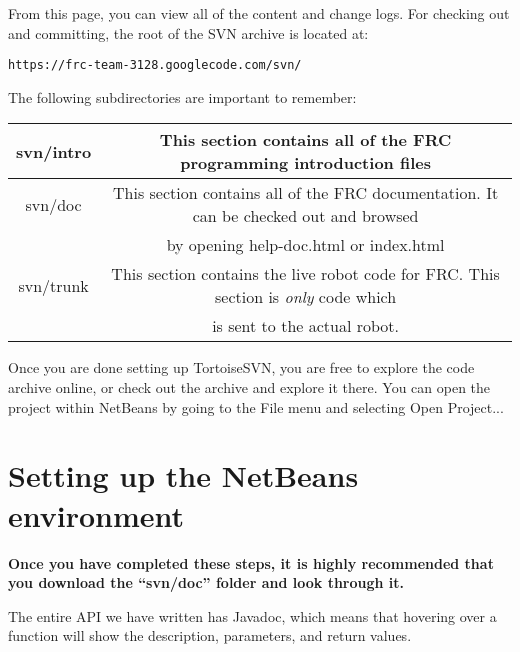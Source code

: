 \documentclass[a4paper]{article}
\begin{document}
From this page, you can view all of the content and change logs. For checking out and committing, the root of the SVN archive is located at: \begin{verbatim}https://frc-team-3128.googlecode.com/svn/\end{verbatim}

The following subdirectories are important to remember:

\noindent\begin{tabular}{|c|c|}
\hline svn/intro & This section contains all of the FRC programming introduction files\\
\hline svn/doc & This section contains all of the FRC documentation. It can be checked out and browsed\\ & by opening help-doc.html or index.html\\
\hline svn/trunk & This section contains the live robot code for FRC. This section is \textit{only} code which \\ & is sent to the actual robot.\\\hline
\end{tabular}

Once you are done setting up TortoiseSVN, you are free to explore the code archive online, or check out the archive and explore it there. You can open the project within NetBeans by going to the File menu and selecting Open Project...

\section{Setting up the NetBeans environment}

\textbf{Once you have completed these steps, it is highly recommended that you download the ``svn/doc'' folder and look through it.}

The entire API we have written has Javadoc, which means that hovering over a function will show the description, parameters, and return values.
\end{document}

